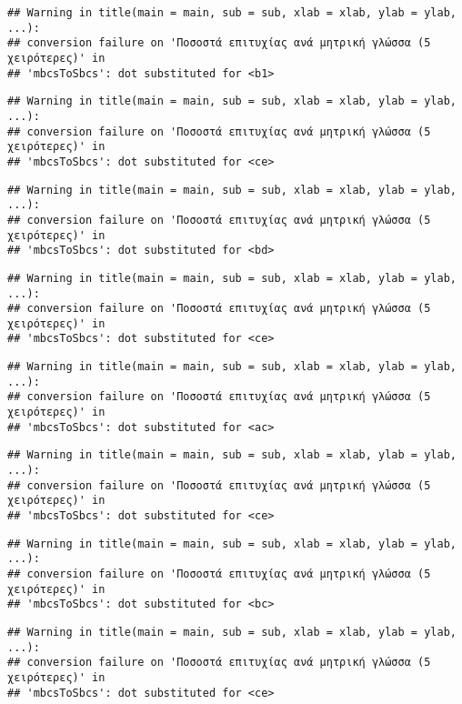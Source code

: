\documentclass[
]{article}
\begin{document}
\begin{verbatim}
## Warning in title(main = main, sub = sub, xlab = xlab, ylab = ylab, ...):
## conversion failure on 'Ποσοστά επιτυχίας ανά μητρική γλώσσα (5 χειρότερες)' in
## 'mbcsToSbcs': dot substituted for <b1>
\end{verbatim}

\begin{verbatim}
## Warning in title(main = main, sub = sub, xlab = xlab, ylab = ylab, ...):
## conversion failure on 'Ποσοστά επιτυχίας ανά μητρική γλώσσα (5 χειρότερες)' in
## 'mbcsToSbcs': dot substituted for <ce>
\end{verbatim}

\begin{verbatim}
## Warning in title(main = main, sub = sub, xlab = xlab, ylab = ylab, ...):
## conversion failure on 'Ποσοστά επιτυχίας ανά μητρική γλώσσα (5 χειρότερες)' in
## 'mbcsToSbcs': dot substituted for <bd>
\end{verbatim}

\begin{verbatim}
## Warning in title(main = main, sub = sub, xlab = xlab, ylab = ylab, ...):
## conversion failure on 'Ποσοστά επιτυχίας ανά μητρική γλώσσα (5 χειρότερες)' in
## 'mbcsToSbcs': dot substituted for <ce>
\end{verbatim}

\begin{verbatim}
## Warning in title(main = main, sub = sub, xlab = xlab, ylab = ylab, ...):
## conversion failure on 'Ποσοστά επιτυχίας ανά μητρική γλώσσα (5 χειρότερες)' in
## 'mbcsToSbcs': dot substituted for <ac>
\end{verbatim}

\begin{verbatim}
## Warning in title(main = main, sub = sub, xlab = xlab, ylab = ylab, ...):
## conversion failure on 'Ποσοστά επιτυχίας ανά μητρική γλώσσα (5 χειρότερες)' in
## 'mbcsToSbcs': dot substituted for <ce>
\end{verbatim}

\begin{verbatim}
## Warning in title(main = main, sub = sub, xlab = xlab, ylab = ylab, ...):
## conversion failure on 'Ποσοστά επιτυχίας ανά μητρική γλώσσα (5 χειρότερες)' in
## 'mbcsToSbcs': dot substituted for <bc>
\end{verbatim}

\begin{verbatim}
## Warning in title(main = main, sub = sub, xlab = xlab, ylab = ylab, ...):
## conversion failure on 'Ποσοστά επιτυχίας ανά μητρική γλώσσα (5 χειρότερες)' in
## 'mbcsToSbcs': dot substituted for <ce>
\end{verbatim}
\end{document}
